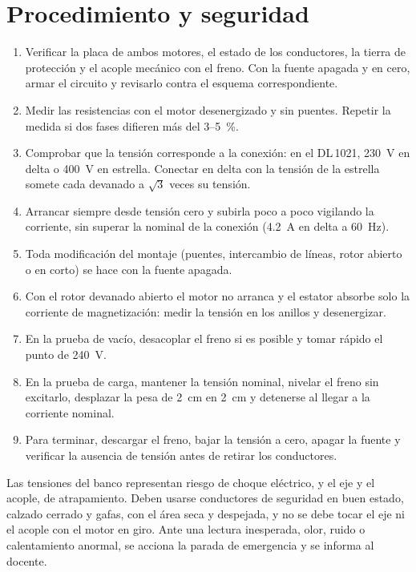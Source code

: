 \documentclass[conference]{IEEEtran}
\begin{document}
\section{Procedimiento y seguridad}
\begin{enumerate}
\item Verificar la placa de ambos motores, el estado de los conductores, la tierra de protección y el acople mecánico con el freno. Con la fuente apagada y en cero, armar el circuito y revisarlo contra el esquema correspondiente.
\item Medir las resistencias con el motor desenergizado y sin puentes. Repetir la medida si dos fases difieren más del 3--5~\%.
\item Comprobar que la tensión corresponde a la conexión: en el DL\,1021, \SI{230}{V} en delta o \SI{400}{V} en estrella. Conectar en delta con la tensión de la estrella somete cada devanado a $\sqrt3$ veces su tensión.
\item Arrancar siempre desde tensión cero y subirla poco a poco vigilando la corriente, sin superar la nominal de la conexión (\SI{4,2}{A} en delta a \SI{60}{Hz}).
\item Toda modificación del montaje (puentes, intercambio de líneas, rotor abierto o en corto) se hace con la fuente apagada.
\item Con el rotor devanado abierto el motor no arranca y el estator absorbe solo la corriente de magnetización: medir la tensión en los anillos y desenergizar.
\item En la prueba de vacío, desacoplar el freno si es posible y tomar rápido el punto de \SI{240}{V}.
\item En la prueba de carga, mantener la tensión nominal, nivelar el freno sin excitarlo, desplazar la pesa de \SI{2}{cm} en \SI{2}{cm} y detenerse al llegar a la corriente nominal.
\item Para terminar, descargar el freno, bajar la tensión a cero, apagar la fuente y verificar la ausencia de tensión antes de retirar los conductores.
\end{enumerate}
Las tensiones del banco representan riesgo de choque eléctrico, y el eje y el acople, de atrapamiento. Deben usarse conductores de seguridad en buen estado, calzado cerrado y gafas, con el área seca y despejada, y no se debe tocar el eje ni el acople con el motor en giro. Ante una lectura inesperada, olor, ruido o calentamiento anormal, se acciona la parada de emergencia y se informa al docente.
\end{document}
